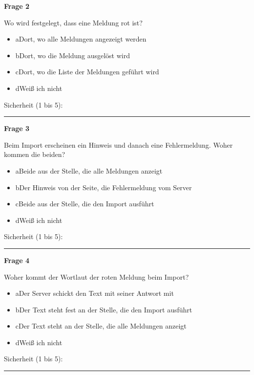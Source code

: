 \noindent\begin{minipage}{\linewidth}
\textbf{Frage 2}\par
Wo wird festgelegt, dass eine Meldung rot ist?

\begin{itemize}[nosep,leftmargin=2.4em]
\item[\kreuz] a\quad Dort, wo alle Meldungen angezeigt werden
\item[\kreuz] b\quad Dort, wo die Meldung ausgelöst wird
\item[\kreuz] c\quad Dort, wo die Liste der Meldungen geführt wird
\item[\kreuz] d\quad Weiß ich nicht
\end{itemize}
\noindent Sicherheit (1 bis 5):~\rule{2.5em}{0.4pt}\par
\end{minipage}

\medskip

\noindent\begin{minipage}{\linewidth}
\textbf{Frage 3}\par
Beim Import erscheinen ein Hinweis und danach eine Fehlermeldung. Woher kommen die beiden?

\begin{itemize}[nosep,leftmargin=2.4em]
\item[\kreuz] a\quad Beide aus der Stelle, die alle Meldungen anzeigt
\item[\kreuz] b\quad Der Hinweis von der Seite, die Fehlermeldung vom Server
\item[\kreuz] c\quad Beide aus der Stelle, die den Import ausführt
\item[\kreuz] d\quad Weiß ich nicht
\end{itemize}
\noindent Sicherheit (1 bis 5):~\rule{2.5em}{0.4pt}\par
\end{minipage}

\medskip

\noindent\begin{minipage}{\linewidth}
\textbf{Frage 4}\par
Woher kommt der Wortlaut der roten Meldung beim Import?

\begin{itemize}[nosep,leftmargin=2.4em]
\item[\kreuz] a\quad Der Server schickt den Text mit seiner Antwort mit
\item[\kreuz] b\quad Der Text steht fest an der Stelle, die den Import ausführt
\item[\kreuz] c\quad Der Text steht an der Stelle, die alle Meldungen anzeigt
\item[\kreuz] d\quad Weiß ich nicht
\end{itemize}
\noindent Sicherheit (1 bis 5):~\rule{2.5em}{0.4pt}\par
\end{minipage}

